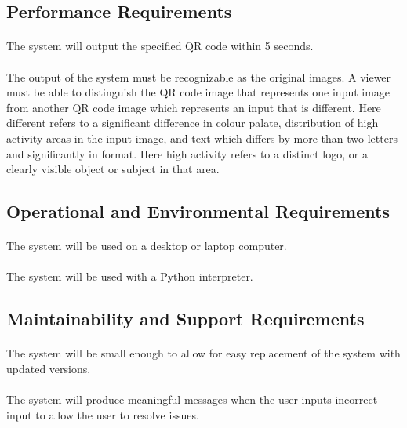 \documentclass[12pt, titlepage]{article}
\begin{document}
\subsection{Performance Requirements}

	\paragraph{}
	The system will output the specified QR code within 5 seconds.
	\paragraph{}
	The output of the system must be recognizable as the original images. A 
	viewer must be able to distinguish the QR code image that represents one 
	input image from another QR code image which represents an input that is 
	different. Here	different refers to a significant difference in colour 
	palate, distribution of high activity areas in the input image, and text 
	which differs by more than two letters and significantly in format. Here 
	high activity refers to	a distinct logo, or a clearly visible object or 
	subject in that area.

\subsection{Operational and Environmental Requirements}
	
	\paragraph{}
	The system will be used on a desktop or laptop computer.
	\paragraph{}
	The system will be used with a Python interpreter.
	
\subsection{Maintainability and Support Requirements}

	\paragraph{}
	The system will be small enough to allow for easy replacement of the system 
	with updated versions.
	\paragraph{}
	The system will produce meaningful messages when the user inputs incorrect 
	input to allow the user to resolve issues.
\end{document}
